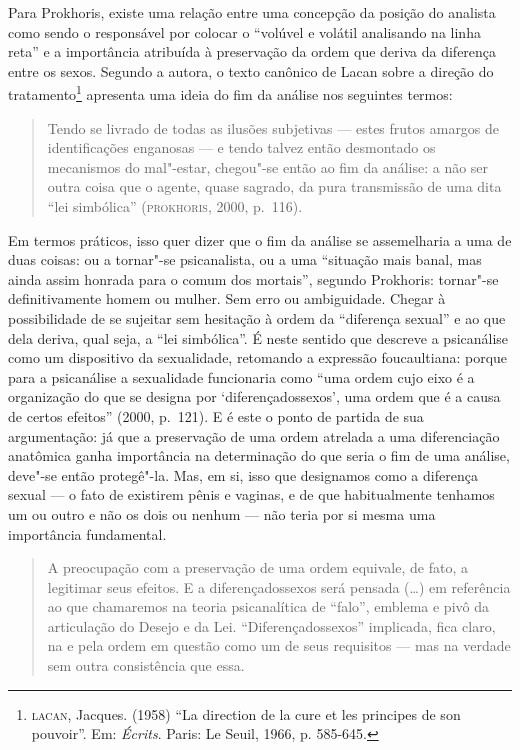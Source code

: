 Para Prokhoris, existe uma relação entre uma concepção da posição do
analista como sendo o responsável por colocar o ``volúvel e volátil
analisando na linha reta'' e a importância atribuída à preservação da
ordem que deriva da diferença entre os sexos. Segundo a autora, o texto
canônico de Lacan sobre a direção do tratamento\footnote{\textsc{lacan}, Jacques.
  (1958) ``La direction de la cure et les principes de son pouvoir''. Em:
  \emph{Écrits}. Paris: Le Seuil, 1966, p. 585-645.} apresenta uma ideia do fim
da análise nos seguintes termos:

\begin{quote}
Tendo se livrado de todas as ilusões subjetivas --- estes frutos
amargos de identificações enganosas --- e tendo talvez então desmontado
os mecanismos do mal"-estar, chegou"-se então ao fim da análise: a não
ser outra coisa que o agente, quase sagrado, da pura transmissão de uma
dita ``lei simbólica'' (\textsc{prokhoris}, 2000, p.~116).
\end{quote}

Em termos práticos, isso quer dizer que o fim da análise se assemelharia
a uma de duas coisas: ou a tornar"-se psicanalista, ou a uma ``situação
mais banal, mas ainda assim honrada para o comum dos mortais'', segundo
Prokhoris: tornar"-se definitivamente homem ou mulher. Sem erro ou
ambiguidade. Chegar à possibilidade de se sujeitar sem hesitação à ordem
da ``diferença sexual'' e ao que dela deriva, qual seja, a ``lei
simbólica''. É neste sentido que descreve a psicanálise como um
dispositivo da sexualidade, retomando a expressão foucaultiana: porque
para a psicanálise a sexualidade funcionaria como ``uma ordem cujo eixo
é a organização do que se designa por `diferençadossexos', uma ordem
que é a causa de certos efeitos'' (2000, p.~121). E é este o ponto de partida
de sua argumentação: já que a preservação de uma ordem atrelada a uma
diferenciação anatômica ganha importância na determinação do que seria o
fim de uma análise, deve"-se então protegê"-la. Mas, em si, isso que
designamos como a diferença sexual --- o fato de existirem pênis e
vaginas, e de que habitualmente tenhamos um ou outro e não os dois ou
nenhum --- não teria por si mesma uma importância fundamental.

\begin{quote}
A preocupação com a preservação de uma ordem equivale, de fato, a
legitimar seus efeitos. E a diferençadossexos será pensada (\ldots{})
em referência ao que chamaremos na teoria psicanalítica de ``falo'',
emblema e pivô da articulação do Desejo e da Lei. ``Diferençadossexos''
implicada, fica claro, na e pela ordem em questão como um de seus
requisitos --- mas na verdade sem outra consistência que essa. %
\end{quote}

